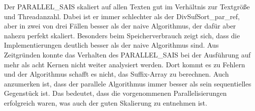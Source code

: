 \FloatBarrier
{}
\noindent Der PARALLEL\_SAIS skaliert auf allen Texten gut im Verhältnis zur Textgröße und Threadanzahl. Dabei ist er immer schlechter als der DivSufSort\_par\_ref, aber in zwei von drei Fällen besser als der naive Algorithmus, der dafür aber nahezu perfekt skaliert. Besonders beim Speicherverbrauch zeigt sich, dass die Implementierungen deutlich besser als der naive Algorithmus sind. Aus Zeitgründen konnte das Verhalten des PARALLEL\_SAIS bei der Ausführung auf mehr als acht Kernen nicht weiter analysiert werden. Dort kommt es zu Fehlern und der Algorithmus schafft es nicht, das Suffix-Array zu berechnen. Auch anzumerken ist, dass der parallele Algorithmus immer besser als sein sequentielles Gegenstück ist. Das bedeutet, dass die vorgenommenen Parallelisierungen erfolgreich waren, was auch der guten Skalierung zu entnehmen ist. 